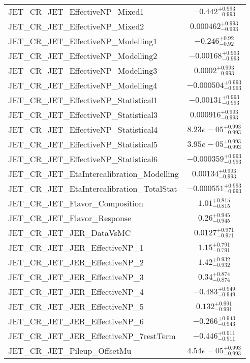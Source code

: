 \begin{tabular}{|l|c|}
JET\_CR\_JET\_EffectiveNP\_Mixed1 & $-0.442^{+0.993}_{-0.993}$ \\
JET\_CR\_JET\_EffectiveNP\_Mixed2 & $0.000462^{+0.993}_{-0.993}$ \\
JET\_CR\_JET\_EffectiveNP\_Modelling1 & $-0.246^{+0.92}_{-0.92}$ \\
JET\_CR\_JET\_EffectiveNP\_Modelling2 & $-0.00168^{+0.993}_{-0.993}$ \\
JET\_CR\_JET\_EffectiveNP\_Modelling3 & $0.0002^{+0.993}_{-0.993}$ \\
JET\_CR\_JET\_EffectiveNP\_Modelling4 & $-0.000504^{+0.993}_{-0.993}$ \\
JET\_CR\_JET\_EffectiveNP\_Statistical1 & $-0.00131^{+0.993}_{-0.993}$ \\
JET\_CR\_JET\_EffectiveNP\_Statistical3 & $0.000916^{+0.993}_{-0.993}$ \\
JET\_CR\_JET\_EffectiveNP\_Statistical4 & $8.23e-05^{+0.993}_{-0.993}$ \\
JET\_CR\_JET\_EffectiveNP\_Statistical5 & $3.95e-05^{+0.993}_{-0.993}$ \\
JET\_CR\_JET\_EffectiveNP\_Statistical6 & $-0.000359^{+0.993}_{-0.993}$ \\
JET\_CR\_JET\_EtaIntercalibration\_Modelling & $0.00134^{+0.993}_{-0.993}$ \\
JET\_CR\_JET\_EtaIntercalibration\_TotalStat & $-0.000551^{+0.993}_{-0.993}$ \\
JET\_CR\_JET\_Flavor\_Composition & $1.01^{+0.815}_{-0.815}$ \\
JET\_CR\_JET\_Flavor\_Response & $0.26^{+0.945}_{-0.945}$ \\
JET\_CR\_JET\_JER\_DataVsMC & $0.0127^{+0.971}_{-0.971}$ \\
JET\_CR\_JET\_JER\_EffectiveNP\_1 & $1.15^{+0.791}_{-0.791}$ \\
JET\_CR\_JET\_JER\_EffectiveNP\_2 & $1.42^{+0.932}_{-0.932}$ \\
JET\_CR\_JET\_JER\_EffectiveNP\_3 & $0.34^{+0.874}_{-0.874}$ \\
JET\_CR\_JET\_JER\_EffectiveNP\_4 & $-0.483^{+0.949}_{-0.949}$ \\
JET\_CR\_JET\_JER\_EffectiveNP\_5 & $0.132^{+0.991}_{-0.991}$ \\
JET\_CR\_JET\_JER\_EffectiveNP\_6 & $-0.266^{+0.943}_{-0.943}$ \\
JET\_CR\_JET\_JER\_EffectiveNP\_7restTerm & $-0.446^{+0.911}_{-0.911}$ \\
JET\_CR\_JET\_Pileup\_OffsetMu & $4.54e-05^{+0.993}_{-0.993}$ \\

\end{tabular}
